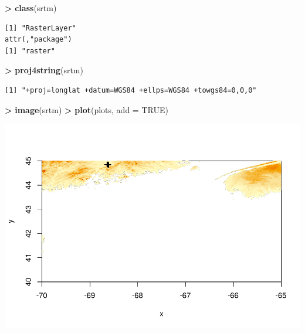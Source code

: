 \documentclass[
]{krantz}
\makeatletter
\newenvironment{Shaded}{\begin{snugshade}}{\end{snugshade}}
\newcommand{\DataTypeTok}[1]{\textcolor[rgb]{0.27,0.27,0.27}{#1}}
\newcommand{\KeywordTok}[1]{\textcolor[rgb]{0.27,0.27,0.27}{\textbf{#1}}}
\newcommand{\NormalTok}[1]{#1}
\newcommand{\OperatorTok}[1]{\textcolor[rgb]{0.43,0.43,0.43}{\textbf{#1}}}
\newcommand{\OtherTok}[1]{\textcolor[rgb]{0.37,0.37,0.37}{#1}}
\newcommand{\StringTok}[1]{\textcolor[rgb]{0.5,0.5,0.5}{#1}}
\newenvironment{kframe}{%
\medskip{}
\setlength{\fboxsep}{.8em}
 \def\at@end@of@kframe{}%
 \ifinner\ifhmode%
  \def\at@end@of@kframe{\end{minipage}}%
  \begin{minipage}{\columnwidth}%
 \fi\fi%
 \def\FrameCommand##1{\hskip\@totalleftmargin \hskip-\fboxsep
 \colorbox{shadecolor}{##1}\hskip-\fboxsep
     \hskip-\linewidth \hskip-\@totalleftmargin \hskip\columnwidth}%
 \MakeFramed {\advance\hsize-\width
   \@totalleftmargin\z@ \linewidth\hsize
   \@setminipage}}%
 {\par\unskip\endMakeFramed%
 \at@end@of@kframe}
\renewenvironment{Shaded}{\begin{kframe}}{\end{kframe}}
\makeatother
\begin{document}
\begin{Shaded}
\begin{Highlighting}[]
\OperatorTok{\textgreater{}}\StringTok{ }\KeywordTok{class}\NormalTok{(srtm)}
\end{Highlighting}
\end{Shaded}

\begin{verbatim}
[1] "RasterLayer"
attr(,"package")
[1] "raster"
\end{verbatim}

\begin{Shaded}
\begin{Highlighting}[]
\OperatorTok{\textgreater{}}\StringTok{ }\KeywordTok{proj4string}\NormalTok{(srtm)}
\end{Highlighting}
\end{Shaded}

\begin{verbatim}
[1] "+proj=longlat +datum=WGS84 +ellps=WGS84 +towgs84=0,0,0"
\end{verbatim}

\begin{Shaded}
\begin{Highlighting}[]
\OperatorTok{\textgreater{}}\StringTok{ }\KeywordTok{image}\NormalTok{(srtm)}
\OperatorTok{\textgreater{}}\StringTok{ }\KeywordTok{plot}\NormalTok{(plots, }\DataTypeTok{add =} \OtherTok{TRUE}\NormalTok{)}
\end{Highlighting}
\end{Shaded}

\includegraphics{bookdown_files/figure-latex/unnamed-chunk-213-1.pdf}
\end{document}
